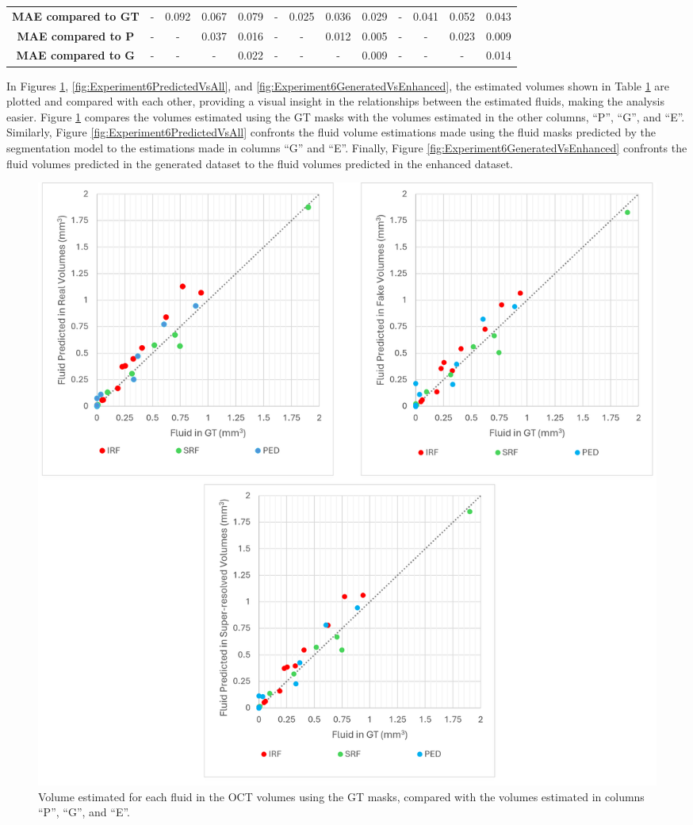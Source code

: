 \begin{table}[!ht]
{\begin{tabular}{|c|c|cccc|cccc|cccc|}
		\hline
		\multicolumn{2}{|c|}{\textbf{MAE compared to GT}} & - & 0.092 & 0.067 & 0.079 & - & 0.025 & 0.036 & 0.029 & - & 0.041 & 0.052 & 0.043 \\ 
		\multicolumn{2}{|c|}{\textbf{MAE compared to P}} & - & - & 0.037 & 0.016 & - & - & 0.012 & 0.005 & - & - & 0.023 & 0.009 \\
		\multicolumn{2}{|c|}{\textbf{MAE compared to G}} & - & - & - & 0.022 & - & - & - & 0.009 & - & - & - & 0.014 \\ 
		\hline
		
	\end{tabular}}
	\label{tab:FluidVolumesExperiment6}
\end{table}

In Figures \ref{fig:Experiment6GTvsAll}, \ref{fig:Experiment6PredictedVsAll}, and \ref{fig:Experiment6GeneratedVsEnhanced}, the estimated volumes shown in Table \ref{tab:FluidVolumesExperiment6} are plotted and compared with each other, providing a visual insight in the relationships between the estimated fluids, making the analysis easier. Figure \ref{fig:Experiment6GTvsAll} compares the volumes estimated using the GT masks with the volumes estimated in the other columns, ``P'', ``G'', and ``E''. Similarly, Figure \ref{fig:Experiment6PredictedVsAll} confronts the fluid volume estimations made using the fluid masks predicted by the segmentation model to the estimations made in columns ``G'' and ``E''. Finally, Figure \ref{fig:Experiment6GeneratedVsEnhanced} confronts the fluid volumes predicted in the generated dataset to the fluid volumes predicted in the enhanced dataset.

\begin{figure}[!ht]
	\centering	
	\includegraphics[width=1.0\linewidth]{figures/Experiment6GTvsAll.png}
	\caption{Volume estimated for each fluid in the OCT volumes using the GT masks, compared with the volumes estimated in columns ``P'', ``G'', and ``E''.}
	\label{fig:Experiment6GTvsAll}
\end{figure}

